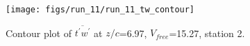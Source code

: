 \begin{figure}[H]
\centering
\texttt{[image: figs/run\_11/run\_11\_tw\_contour]}
\caption{Contour plot of $\overline{t^\prime w^\prime}$ at $z/c$=6.97, $V_{free}$=15.27, station 2.}
\label{fig:run_11_tw_contour}
\end{figure}


